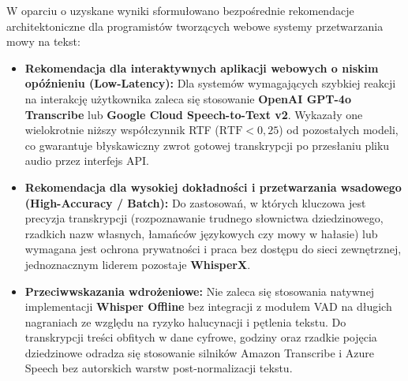 W oparciu o uzyskane wyniki sformułowano bezpośrednie rekomendacje architektoniczne dla programistów tworzących webowe systemy przetwarzania mowy na tekst:

\begin{itemize}
    \item \textbf{Rekomendacja dla interaktywnych aplikacji webowych o niskim opóźnieniu (Low-Latency):} Dla systemów wymagających szybkiej reakcji na interakcję użytkownika zaleca się stosowanie \textbf{OpenAI GPT-4o Transcribe} lub \textbf{Google Cloud Speech-to-Text v2}. Wykazały one wielokrotnie niższy współczynnik RTF ($\text{RTF} < 0{,}25$) od pozostałych modeli, co gwarantuje błyskawiczny zwrot gotowej transkrypcji po przesłaniu pliku audio przez interfejs API.
    \item \textbf{Rekomendacja dla wysokiej dokładności i przetwarzania wsadowego (High-Accuracy / Batch):} Do zastosowań, w których kluczowa jest precyzja transkrypcji (rozpoznawanie trudnego słownictwa dziedzinowego, rzadkich nazw własnych, łamańców językowych czy mowy w hałasie) lub wymagana jest ochrona prywatności i praca bez dostępu do sieci zewnętrznej, jednoznacznym liderem pozostaje \textbf{WhisperX}.
    \item \textbf{Przeciwwskazania wdrożeniowe:} Nie zaleca się stosowania natywnej implementacji \textbf{Whisper Offline} bez integracji z modułem VAD na długich nagraniach ze względu na ryzyko halucynacji i pętlenia tekstu. Do transkrypcji treści obfitych w dane cyfrowe, godziny oraz rzadkie pojęcia dziedzinowe odradza się stosowanie silników Amazon Transcribe i Azure Speech bez autorskich warstw post-normalizacji tekstu.
\end{itemize}
